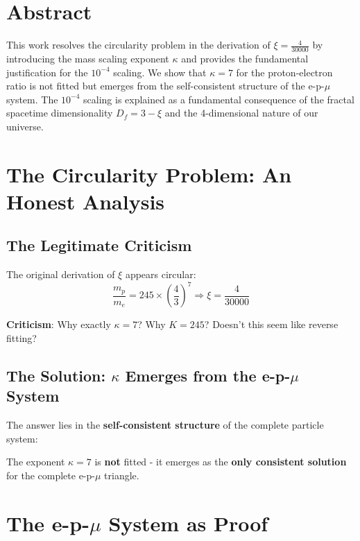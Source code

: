 \section*{Abstract}
		This work resolves the circularity problem in the derivation of $\xi = \frac{4}{30000}$ by introducing the mass scaling exponent $\kappa$ and provides the fundamental justification for the $10^{-4}$ scaling. We show that $\kappa = 7$ for the proton-electron ratio is not fitted but emerges from the self-consistent structure of the e-p-$\mu$ system. The $10^{-4}$ scaling is explained as a fundamental consequence of the fractal spacetime dimensionality $D_f = 3 - \xi$ and the 4-dimensional nature of our universe.

	
	\section{The Circularity Problem: An Honest Analysis}
	
	\subsection{The Legitimate Criticism}
	
	The original derivation of $\xi$ appears circular:
	\begin{equation}
		\frac{m_p}{m_e} = 245 \times \left( \frac{4}{3} \right)^7 \Rightarrow \xi = \frac{4}{30000}
	\end{equation}
	
	\textbf{Criticism}: Why exactly $\kappa = 7$? Why $K = 245$? Doesn't this seem like reverse fitting?
	
	\subsection{The Solution: $\kappa$ Emerges from the e-p-$\mu$ System}
	
	The answer lies in the \textbf{self-consistent structure} of the complete particle system:
	
	\begin{tcolorbox}[colback=blue!5!white,colframe=blue!75!black,title={Key Insight}]
		The exponent $\kappa = 7$ is \textbf{not} fitted - it emerges as the \textbf{only consistent solution} for the complete e-p-$\mu$ triangle.
	\end{tcolorbox}
	
	\section{The e-p-$\mu$ System as Proof}
	
